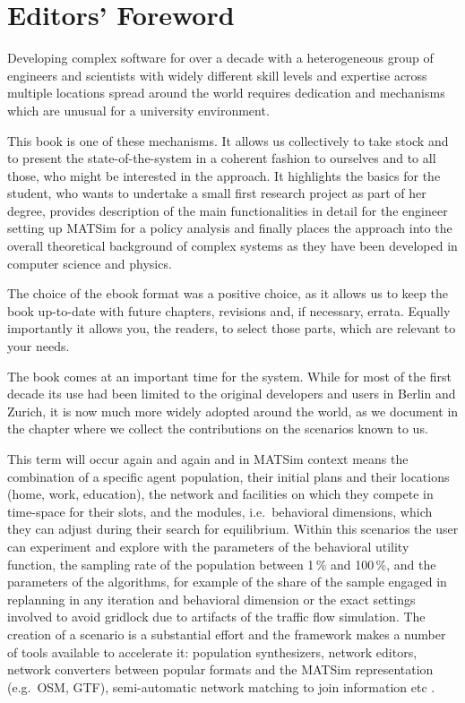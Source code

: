 \chapter*{Editors' Foreword}
Developing complex software for over a decade with a heterogeneous group of engineers and scientists with widely different skill levels and expertise across multiple locations spread around the world requires dedication and mechanisms which are unusual for a university environment. 

This book is one of these mechanisms. It allows us collectively to take stock and to present the state-of-the-system in a coherent fashion to ourselves and to all those, who might be interested in the approach. It highlights the basics for the student, who wants to undertake a small  first research project as part of her degree, provides description of the main functionalities in detail for the engineer setting up MATSim for a policy analysis and finally places the approach into the overall theoretical background of complex systems as they have been developed in computer science and physics. 

The choice of the ebook format was a positive choice, as it allows us to keep the book up-to-date with future chapters, revisions and, if necessary, errata. Equally importantly it allows you, the readers, to select those parts, which are relevant to your needs. 

The book comes at an important time for the system. While for most of the first decade its use had been limited to the original developers and users in Berlin and Zurich, it is now much more widely adopted around the world, as we document in the chapter where we collect the contributions on the scenarios known to us. 

This term will occur again and again and in MATSim context means the combination of a specific agent population, their initial plans and their locations (home, work, education), the network and facilities on which they compete in time-space for their slots, and the modules, i.e.\, behavioral dimensions, which they can adjust during their search for equilibrium. Within this scenarios the user can experiment and explore with the parameters of the behavioral utility function, the sampling rate of the population between 1\,\% and 100\,\%, and the parameters of the algorithms, for example of the share of the sample engaged in replanning in any iteration and behavioral dimension or the exact settings involved to avoid gridlock due to artifacts of the traffic flow simulation. The creation of a \gls{scenario} is a substantial effort and the framework makes a number of tools available to accelerate it: population synthesizers, network editors, network converters between popular formats and the MATSim representation (e.g.\ OSM, GTF), semi-automatic network matching to join information etc .

